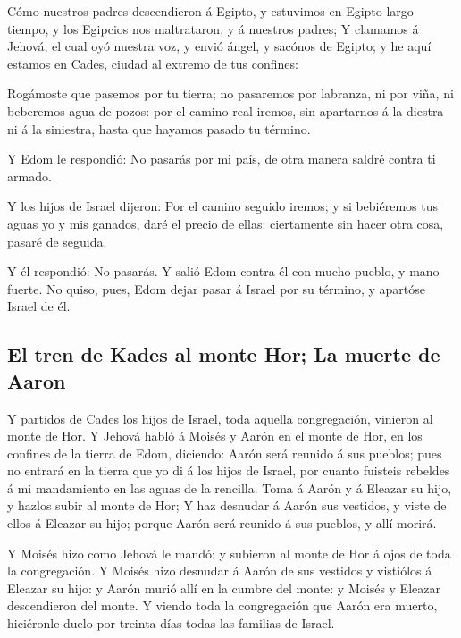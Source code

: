  Cómo nuestros padres descendieron á Egipto, y estuvimos
en Egipto largo tiempo, y los Egipcios nos maltrataron, y á nuestros
padres;  Y clamamos á Jehová, el cual oyó nuestra voz, y
envió ángel, y sacónos de Egipto; y he aquí estamos en Cades, ciudad al
extremo de tus confines:

 Rogámoste que pasemos por tu tierra; no pasaremos por
labranza, ni por viña, ni beberemos agua de pozos: por el camino real
iremos, sin apartarnos á la diestra ni á la siniestra, hasta que hayamos
pasado tu término.

 Y Edom le respondió: No pasarás por mi país, de otra
manera saldré contra ti armado.

 Y los hijos de Israel dijeron: Por el camino seguido
iremos; y si bebiéremos tus aguas yo y mis ganados, daré el precio de
ellas: ciertamente sin hacer otra cosa, pasaré de seguida.

 Y él respondió: No pasarás. Y salió Edom contra él con
mucho pueblo, y mano fuerte.  No quiso, pues, Edom dejar
pasar á Israel por su término, y apartóse Israel de él.

\hypertarget{el-tren-de-kades-al-monte-hor-la-muerte-de-aaron}{%
\subsection{El tren de Kades al monte Hor; La muerte de
Aaron}\label{el-tren-de-kades-al-monte-hor-la-muerte-de-aaron}}

 Y partidos de Cades los hijos de Israel, toda aquella
congregación, vinieron al monte de Hor.  Y Jehová habló á
Moisés y Aarón en el monte de Hor, en los confines de la tierra de Edom,
diciendo:  Aarón será reunido á sus pueblos; pues no
entrará en la tierra que yo di á los hijos de Israel, por cuanto
fuisteis rebeldes á mi mandamiento en las aguas de la rencilla.
 Toma á Aarón y á Eleazar su hijo, y hazlos subir al
monte de Hor;  Y haz desnudar á Aarón sus vestidos, y
viste de ellos á Eleazar su hijo; porque Aarón será reunido á sus
pueblos, y allí morirá.

 Y Moisés hizo como Jehová le mandó: y subieron al monte
de Hor á ojos de toda la congregación.  Y Moisés hizo
desnudar á Aarón de sus vestidos y vistiólos á Eleazar su hijo: y Aarón
murió allí en la cumbre del monte: y Moisés y Eleazar descendieron del
monte.  Y viendo toda la congregación que Aarón era
muerto, hiciéronle duelo por treinta días todas las familias de Israel.


